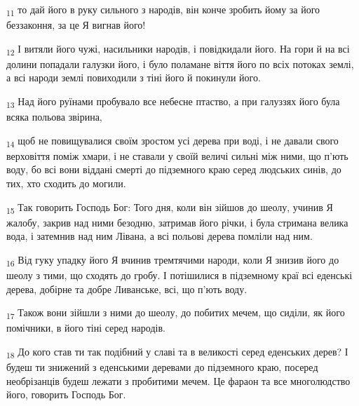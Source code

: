 \begin{tcolorbox}
\textsubscript{11} то дай його в руку сильного з народів, він конче зробить йому за його беззаконня, за це Я вигнав його!
\end{tcolorbox}
\begin{tcolorbox}
\textsubscript{12} І витяли його чужі, насильники народів, і повідкидали його. На гори й на всі долини попадали галузки його, і було поламане віття його по всіх потоках землі, а всі народи землі повиходили з тіні його й покинули його.
\end{tcolorbox}
\begin{tcolorbox}
\textsubscript{13} Над його руїнами пробувало все небесне птаство, а при галуззях його була всяка польова звірина,
\end{tcolorbox}
\begin{tcolorbox}
\textsubscript{14} щоб не повищувалися своїм зростом усі дерева при воді, і не давали свого верховіття поміж хмари, і не ставали у своїй величі сильні між ними, що п'ють воду, бо всі вони віддані смерті до підземного краю серед людських синів, до тих, хто сходить до могили.
\end{tcolorbox}
\begin{tcolorbox}
\textsubscript{15} Так говорить Господь Бог: Того дня, коли він зійшов до шеолу, учинив Я жалобу, закрив над ними безодню, затримав його річки, і була стримана велика вода, і затемнив над ним Лівана, а всі польові дерева помліли над ним.
\end{tcolorbox}
\begin{tcolorbox}
\textsubscript{16} Від гуку упадку його Я вчинив тремтячими народи, коли Я знизив його до шеолу з тими, що сходять до гробу. І потішилися в підземному краї всі еденські дерева, добірне та добре Ливанське, всі, що п'ють воду.
\end{tcolorbox}
\begin{tcolorbox}
\textsubscript{17} Також вони зійшли з ними до шеолу, до побитих мечем, що сиділи, як його помічники, в його тіні серед народів.
\end{tcolorbox}
\begin{tcolorbox}
\textsubscript{18} До кого став ти так подібний у славі та в великості серед еденських дерев? І будеш ти знижений з еденськими деревами до підземного краю, посеред необрізанців будеш лежати з пробитими мечем. Це фараон та все многолюдство його, говорить Господь Бог.
\end{tcolorbox}
